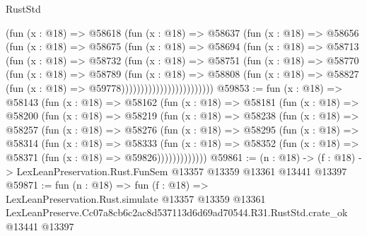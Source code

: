\begin{lexlean}{RustStd}
\begin{coremodule}
                          (fun (x : @18) =>
                          @58618
                            (fun (x : @18) =>
                            @58637
                              (fun (x : @18) =>
                              @58656
                                (fun (x : @18) =>
                                @58675
                                  (fun (x : @18) =>
                                  @58694
                                    (fun (x : @18) =>
                                    @58713
                                      (fun (x : @18) =>
                                      @58732
                                        (fun (x : @18) =>
                                        @58751
                                          (fun (x : @18) =>
                                          @58770
                                            (fun (x : @18) =>
                                            @58789
                                              (fun (x : @18) =>
                                              @58808
                                                (fun (x : @18) =>
                                                @58827
                                                  (fun (x : @18) => @59778))))))))))))))))))))))))
@59853 := fun (x : @18) =>
  @58143
    (fun (x : @18) =>
    @58162
      (fun (x : @18) =>
      @58181
        (fun (x : @18) =>
        @58200
          (fun (x : @18) =>
          @58219
            (fun (x : @18) =>
            @58238
              (fun (x : @18) =>
              @58257
                (fun (x : @18) =>
                @58276
                  (fun (x : @18) =>
                  @58295
                    (fun (x : @18) =>
                    @58314
                      (fun (x : @18) =>
                      @58333
                        (fun (x : @18) =>
                        @58352 (fun (x : @18) => @58371 (fun (x : @18) => @59826)))))))))))))
@59861 := (n : @18) ->
  (f : @18) -> LexLeanPreservation.Rust.FunSem @13357 @13359 @13361 @13441 @13397
@59871 := fun (n : @18) =>
  fun (f : @18) =>
  LexLeanPreservation.Rust.simulate
    @13357
    @13359
    @13361
    LexLeanPreserve.Cc07a8cb6c2ac8d537113d6d69ad70544.R31.RustStd.crate_ok
    @13441
    @13397
\end{coremodule}
\end{lexlean}
